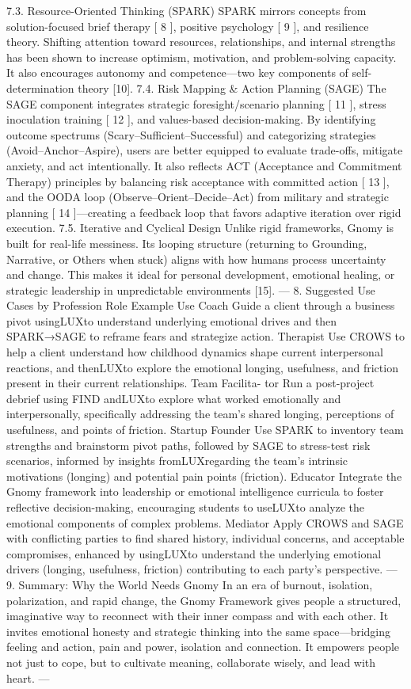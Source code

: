 7.3. Resource-Oriented Thinking (SPARK)
SPARK mirrors concepts from solution-focused brief therapy [ 8 ], positive psychology [ 9 ], and resilience
theory. Shifting attention toward resources, relationships, and internal strengths has been shown to increase
optimism, motivation, and problem-solving capacity. It also encourages autonomy and competence—two
key components of self-determination theory [10].
7.4. Risk Mapping & Action Planning (SAGE)
The SAGE component integrates strategic foresight/scenario planning [ 11 ], stress inoculation training [ 12 ],
and values-based decision-making. By identifying outcome spectrums (Scary–Sufficient–Successful) and
categorizing strategies (Avoid–Anchor–Aspire), users are better equipped to evaluate trade-offs, mitigate
anxiety, and act intentionally. It also reflects ACT (Acceptance and Commitment Therapy) principles by
balancing risk acceptance with committed action [ 13 ], and the OODA loop (Observe–Orient–Decide–Act)
from military and strategic planning [ 14 ]—creating a feedback loop that favors adaptive iteration over
rigid execution.
7.5. Iterative and Cyclical Design
Unlike rigid frameworks, Gnomy is built for real-life messiness. Its looping structure (returning to
Grounding, Narrative, or Others when stuck) aligns with how humans process uncertainty and change.
This makes it ideal for personal development, emotional healing, or strategic leadership in unpredictable
environments [15].
—
8.
Suggested Use Cases by Profession
Role Example Use
Coach Guide a client through a business pivot usingLUXto understand underlying
emotional drives and then SPARK→SAGE to reframe fears and strategize action.
Therapist Use CROWS to help a client understand how childhood dynamics shape current
interpersonal reactions, and thenLUXto explore the emotional longing, usefulness,
and friction present in their current relationships.
Team Facilita-
tor
Run a post-project debrief using FIND andLUXto explore what worked emotionally
and interpersonally, specifically addressing the team’s shared longing, perceptions of
usefulness, and points of friction.
Startup
Founder
Use SPARK to inventory team strengths and brainstorm pivot paths, followed by
SAGE to stress-test risk scenarios, informed by insights fromLUXregarding the
team’s intrinsic motivations (longing) and potential pain points (friction).
Educator Integrate the Gnomy framework into leadership or emotional intelligence curricula
to foster reflective decision-making, encouraging students to useLUXto analyze
the emotional components of complex problems.
Mediator Apply CROWS and SAGE with conflicting parties to find shared history, individual
concerns, and acceptable compromises, enhanced by usingLUXto understand
the underlying emotional drivers (longing, usefulness, friction) contributing to each
party’s perspective.
—
9.
Summary: Why the World Needs Gnomy
In an era of burnout, isolation, polarization, and rapid change, the Gnomy Framework gives people
a structured, imaginative way to reconnect with their inner compass and with each other. It invites
emotional honesty and strategic thinking into the same space—bridging feeling and action, pain and power,
isolation and connection. It empowers people not just to cope, but to cultivate meaning, collaborate
wisely, and lead with heart.
—

